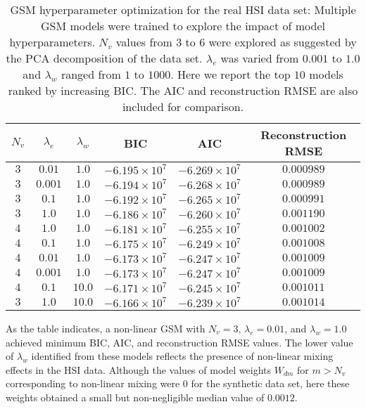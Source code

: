 \begin{table}[H]
  \caption{GSM hyperparameter optimization for the real HSI data set: Multiple
    GSM models were trained to explore the impact of model hyperparameters.
    $N_v$ values from $3$ to $6$ were explored as suggested by the PCA
    decomposition of the data set. $\lambda_e$ was varied from $0.001$ to $1.0$
    and $\lambda_w$ ranged from $1$ to $1000$. Here we report the top $10$
    models ranked by increasing BIC. The AIC and reconstruction RMSE are also
    included for comparison.}
  \label{table:fit-comparison}
  \begin{center}
  \begin{tabular}{cccccc} \hline
    \textbf{$N_v$}	& \textbf{$\lambda_e$}	& \textbf{$\lambda_w$} &
    \textbf{BIC} & \textbf{AIC} & \textbf{Reconstruction RMSE}\\ \hline
    $3$ & $0.01$    & $1.0$     & $-6.195\times10^7$   & $-6.269\times10^7$   & $0.000989$ \\
    $3$	& $0.001$   & $1.0$     & $-6.194\times10^7$   & $-6.268\times10^7$   & $0.000989$ \\
    $3$	& $0.1$     & $1.0$	    & $-6.192\times10^7$   & $-6.265\times10^7$   & $0.000991$ \\
    $3$	& $1.0$     & $1.0$	    & $-6.186\times10^7$   & $-6.260\times10^7$   & $0.001190$ \\
    $4$	& $1.0$     & $1.0$	    & $-6.181\times10^7$   & $-6.255\times10^7$   & $0.001002$ \\
    $4$	& $0.1$     & $1.0$	    & $-6.175\times10^7$   & $-6.249\times10^7$   & $0.001008$ \\
    $4$	& $0.01$    & $1.0$     & $-6.173\times10^7$   & $-6.247\times10^7$   & $0.001009$ \\
    $4$	& $0.001$   & $1.0$     & $-6.173\times10^7$   & $-6.247\times10^7$   & $0.001009$ \\
    $4$	& $0.1$     & $10.0$    & $-6.171\times10^7$   & $-6.245\times10^7$   & $0.001011$ \\
    $3$	& $1.0$     & $10.0$    & $-6.166\times10^7$   & $-6.239\times10^7$   & $0.001014$
  \end{tabular}
  \end{center}
\end{table}

As the table indicates, a non-linear GSM with $N_v=3$, $\lambda_e=0.01$, and
$\lambda_w=1.0$ achieved minimum BIC, AIC, and reconstruction RMSE values. The
lower value of $\lambda_w$ identified from these models reflects the presence of
non-linear mixing effects in the HSI data. Although the values of model weights
$W_{dm}$ for $m>N_v$ corresponding to non-linear mixing were $0$ for the
synthetic data set, here these weights obtained a small but non-negligible
median value of $0.0012$.


